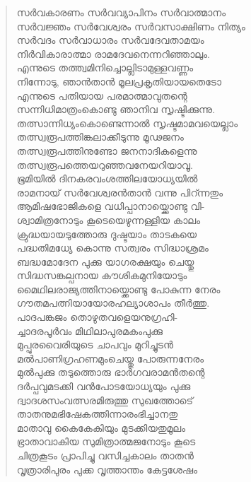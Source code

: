 \begin{verse}
സര്‍വകാരണം സര്‍വവ്യാപിനം സര്‍വാത്മാനം\\
സര്‍വജ്ഞം സര്‍വേശ്വരം സര്‍വസാക്ഷിണം നിത്യം\\
സര്‍വദം സര്‍വാധാരം സര്‍വദേവതാമയം\\
നിര്‍വികാരാത്മാ രാമദേവനെന്നറിഞ്ഞാലും.\\
എന്നുടെ തത്ത്വമിനിച്ചൊല്ലിടാമുള്ളവണ്ണം\\
നിന്നോടു, ഞാന്‍താന്‍ മൂലപ്രകൃതിയായതെടോ\\
എന്നുടെ പതിയായ പരമാത്മാവുതന്റെ\\
സന്നിധിമാത്രംകൊണ്ടു ഞാനിവ സൃഷ്ടിക്കുന്നു.\\
തത്സാന്നിധ്യംകൊണ്ടെന്നാല്‍ സൃഷ്ടമാമവയെല്ലാം\\
തത്സ്വരൂപത്തിങ്കലാക്കീടുന്നു മൂഢജനം\\
തത്സ്വരൂപത്തിനുണ്ടോ ജനനാദികളെന്നു\\
തത്സ്വരൂപത്തെയറുഞ്ഞവനേയറിയാവൂ.\\
ഭൂമിയില്‍ ദിനകരവംശത്തിലയോധ്യയില്‍\\
രാമനായ് സര്‍വേശ്വരന്‍താന്‍ വന്നു പിറ്ന്നതും\\
ആമിഷഭോജികളെ വധിപ്പാനായ്ക്കൊണ്ടു വി-\\
ശ്വാമിത്രനോടും കൂടെയെഴുന്നള്ളിയ കാലം\\
ക്രുദ്ധയായടുത്തോരു ദുഷ്ടയാം താടകയെ\\
പദ്ധതിമധ്യേ കൊന്നു സത്വരം സിദ്ധാശ്രമം\\
ബദ്ധമോദേന പുക്കു യാഗരക്ഷയും ചെയ്തു\\
സിദ്ധസങ്കല്പനായ കൗശികമുനിയോടും\\
മൈഥിലരാജ്യത്തിനായ്ക്കൊണ്ടു പോകുന്ന നേരം\\
ഗൗതമപത്നിയായോരഹല്യാശാപം തീര്‍ത്തു.\\
പാദപങ്കജം തൊഴുതവളെയനുഗ്രഹി-\\
ച്ചാദരപൂര്‍വം മിഥിലാപുരമകംപുക്കു\\
മുപ്പുരവൈരിയുടെ ചാപവും മുറിച്ചുടന്‍\\
മല്‍പാണിഗ്രഹണമുംചെയ്തു പോരുന്നനേരം\\
മുല്‍പുക്കു തടുത്തൊരു ഭാര്‍ഗവരാമന്‍തന്റെ\\
ദര്‍പ്പവുമടക്കി വന്‍പോടയോധ്യയും പുക്കു\\
ദ്വാദശസംവത്സരമിരുത്തു സുഖത്തോടെ്\\
താതനുമഭിഷേകത്തിന്നാരംഭിച്ചാനതു\\
മാതാവു കൈകേകിയും മുടക്കിയതുമൂലം\\
ഭ്രാതാവാകിയ സുമിത്രാത്മജനോടും കൂടെ\\
ചിത്രകൂടം പ്രാപിച്ചു വസിച്ചകാലം താതന്‍\\
വൃത്രാരിപുരം പുക്ക വൃത്താന്തം കേട്ടശേഷം\\

\end{verse}
